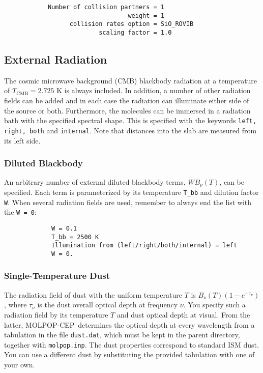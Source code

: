 \documentclass[12pt]{article}
\def\separation {0.5cm}
\def\M{MOLPOP-CEP}
\begin{document}
\vspace{\separation}
\begin{verbatim}
            Number of collision partners = 1
                                  weight = 1
                  collision rates option = SiO_ROVIB
                          scaling factor = 1.0
\end{verbatim}



\subsection{External Radiation}

The cosmic microwave background (CMB) blackbody radiation at a temperature of
$T_\mathrm{CMB}=2.725$ K is always included. In addition, a number of other
radiation fields can be added and in each case the radiation can illuminate
either side of the source or both. Furthermore, the molecules can be immersed
in a radiation bath with the specified spectral shape. This is specified with
the keywords \texttt{left, right, both} and \texttt{internal}. Note that
distances into the slab are measured from its left side.

\subsubsection{Diluted Blackbody}

An arbitrary number of external diluted blackbody terms, $WB_\nu(T)$, can be
specified. Each term is parameterized by its temperature \texttt{T\_bb} and
dilution factor \texttt{W}. When several radiation fields are used, remember to
always end the list with the \texttt{W = 0}:

\vspace{\separation}
\begin{verbatim}
             W = 0.1
             T_bb = 2500 K
             Illumination from (left/right/both/internal) = left
             W = 0.
\end{verbatim}

\subsubsection{Single-Temperature Dust}

The radiation field of dust with the uniform temperature $T$ is $B_\nu(T)(1 -
e^{-\tau_\nu})$, where $\tau_\nu$ is the dust overall optical depth at
frequency $\nu$.  You specify such a radiation field by its temperature $T$ and
dust optical depth at visual. From the latter, \M\ determines the optical depth
at every wavelength from a tabulation in the file {\tt dust.dat}, which must be
kept in the parent directory, together with {\tt molpop.inp}. The dust
properties correspond to standard ISM dust. You can use a different dust by
substituting the provided tabulation with one of your own.
\end{document}
